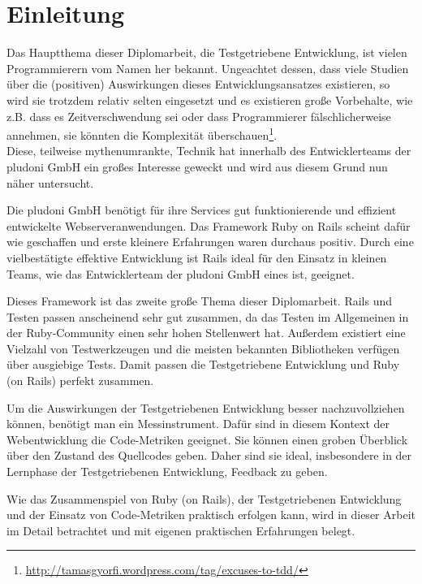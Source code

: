 \chapter{Einleitung}

Das Hauptthema dieser Diplomarbeit, die Testgetriebene Entwicklung, ist vielen Programmierern vom Namen her bekannt. Ungeachtet dessen, dass viele Studien über die (positiven) Auswirkungen dieses Entwicklungsansatzes existieren, so wird sie trotzdem relativ selten eingesetzt und es existieren große Vorbehalte, wie z.B. dass es Zeitverschwendung sei oder dass Programmierer fälschlicherweise annehmen, sie könnten die Komplexität überschauen\footnote{\url{http://tamasgyorfi.wordpress.com/tag/excuses-to-tdd/}}.\\
Diese, teilweise mythenumrankte, Technik hat innerhalb des Entwicklerteams der pludoni GmbH ein großes Interesse geweckt und wird aus diesem Grund nun näher untersucht.

Die pludoni GmbH benötigt für ihre Services gut funktionierende und effizient entwickelte Webserveranwendungen. Das Framework Ruby on Rails scheint dafür wie geschaffen und erste kleinere Erfahrungen waren durchaus positiv. Durch eine vielbestätigte effektive Entwicklung ist Rails ideal für den Einsatz in kleinen Teams, wie das Entwicklerteam der pludoni GmbH eines ist, geeignet.

Dieses Framework ist das zweite große Thema dieser Diplomarbeit. Rails und Testen passen anscheinend sehr gut zusammen, da das Testen im Allgemeinen in der Ruby-Community einen sehr hohen Stellenwert hat. Außerdem existiert eine Vielzahl von Testwerkzeugen und die meisten bekannten Bibliotheken verfügen über ausgiebige Tests. Damit passen die Testgetriebene Entwicklung und Ruby (on Rails) perfekt zusammen.

Um die Auswirkungen der Testgetriebenen Entwicklung besser nachzuvollziehen können, benötigt man ein Messinstrument. Dafür sind in diesem Kontext der Webentwicklung die Code-Metriken geeignet. Sie können einen groben Überblick über den Zustand des Quellcodes geben. Daher sind sie ideal, insbesondere in der Lernphase der Testgetriebenen Entwicklung, Feedback zu geben.

Wie das Zusammenspiel von Ruby (on Rails), der Testgetriebenen Entwicklung und der Einsatz von Code-Metriken praktisch erfolgen kann, wird in dieser Arbeit im Detail betrachtet und mit eigenen praktischen Erfahrungen belegt.

